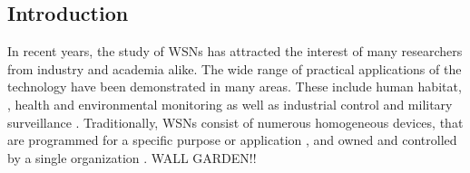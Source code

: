 \subsection{Introduction}

\begin{comment}
The study of Wireless Sensor Networks (WSNs) has increasingly attracted the interest of many researchers in recent years. Their wide range of possible applications have been demonstrated in many areas. These include human habitat, \cite{mainwaring2002wireless}, health \cite{virone2006advanced} and environmental monitoring \cite{4379685,cardell2004field} as well as industry control \cite{1631480} and military surveillance \cite{6268958}.  Advances in the ever-developing field of Micro-Electro-Mechanical Systems (MEMS) in parallel with the latest developments in software technologies have created additional
opportunities to integrate WSNs into our everyday life.  As the field of WSNs matures, ,draws growing attention from industry and academy alike.
%
The explosion of technological innovations in the past decades has irreversibly changed our way of life. Advances in the ever-developing field of Micro-Electro-Mechanical Systems (MEMS), in parallel with the latest developments in software technologies, have created new opportunities to assist our life. By adding computational intelligence to everyday objects they become smarter and more interactive. Together with other embedded devices, such as mobile phones and security cameras, Wireless Sensor Networks (WSNs) contributed to the creation of an additional sensing / actuating layer to our surroundings. This fusion of the various embedded devices into people's living environments is motivated by potential benefits such as simplified management and improved utilization of scarce resources.  

\end{comment}

In recent years, the study of WSNs has attracted the interest of many researchers from industry and academia alike.  The wide range of practical applications of the technology have been demonstrated in many areas. These include human habitat, \cite{mainwaring2002wireless}, health \cite{virone2006advanced} and environmental monitoring \cite{4379685,cardell2004field} as well as industrial control \cite{1631480} and military surveillance \cite{6268958}. Traditionally, WSNs consist of numerous homogeneous devices, that are programmed for a specific purpose or application \cite{ammari2013art,mittal2012contemporary}, and owned and controlled by a single organization \cite{Yick:2008:WSN:1389582.1389832,obaidat2014principles}. WALL GARDEN!!

